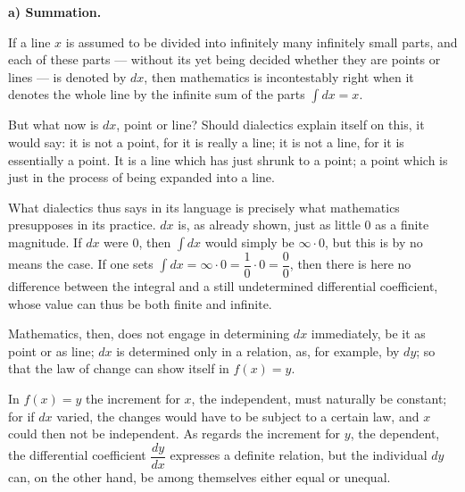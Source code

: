 \documentclass[12pt]{book}
\begin{document}
\begin{center}
\textbf{a) Summation.}
\end{center}
{}

If a line $x$ is assumed to be divided into infinitely many infinitely small parts,
and each of these parts --- without its yet being decided whether they are points or
lines --- is denoted by $dx$, then mathematics is incontestably right when it denotes
the whole line by the infinite sum of the parts $\int dx = x$.

But what now is $dx$, point or line? Should dialectics explain itself on this, it
would say: it is not a point, for it is really a line; it is not a line, for it is
essentially a point. It is a line which has just shrunk to a point; a point which is
just in the process of being expanded into a line.

What dialectics thus says in its language is precisely what mathematics presupposes in
its practice. $dx$ is, as already shown, just as little 0 as a finite magnitude. If
$dx$ were 0, then $\int dx$ would simply be $\infty\cdot 0$, but this is by no means
the case. If one sets $\int dx = \infty\cdot 0 = \dfrac{1}{0}\cdot 0 = \dfrac{0}{0}$,
then there is here no difference between the integral and a still undetermined
differential coefficient, whose value can thus be both finite and infinite.

Mathematics, then, does not engage in determining $dx$ immediately, be it as point or
as line;
$dx$ is determined only in a relation, as, for example, by $dy$; so that the law of
change can show itself in $f(x) = y$.

In $f(x) = y$ the increment for $x$, the independent, must naturally be constant; for
if $dx$ varied, the changes would have to be subject to a certain law, and $x$ could
then not be independent. As regards the increment for $y$, the dependent, the
differential coefficient $\dfrac{dy}{dx}$ expresses a definite relation, but the
individual $dy$ can, on the other hand, be among themselves either equal or unequal.
\end{document}
